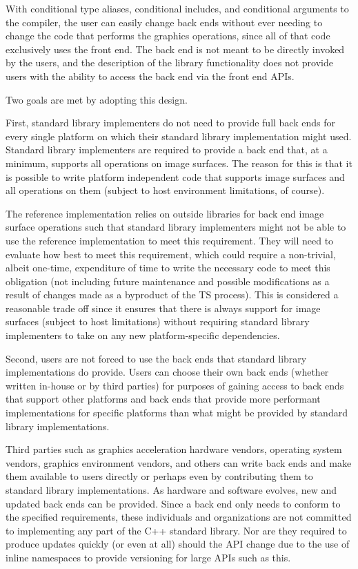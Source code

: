 \pnum
With conditional type aliases, conditional includes, and conditional arguments to the compiler, the user can easily change back ends without ever needing to change the code that performs the graphics operations, since all of that code exclusively uses the front end. The back end is not meant to be directly invoked by the users, and the description of the library functionality does not provide users with the ability to access the back end via the front end APIs.

\pnum
Two goals are met by adopting this design.

\pnum
First, standard library implementers do not need to provide full back ends for every single platform on which their standard library implementation might used. Standard library implementers are required to provide a back end that, at a minimum, supports all operations on image surfaces. The reason for this is that it is possible to write platform independent code that supports image surfaces and all operations on them (subject to host environment limitations, of course).

\pnum
The reference implementation relies on outside libraries for back end image surface operations such that standard library implementers might not be able to use the reference implementation to meet this requirement. They will need to evaluate how best to meet this requirement, which could require a non-trivial, albeit one-time, expenditure of time to write the necessary code to meet this obligation (not including future maintenance and possible modifications as a result of changes made as a byproduct of the TS process). This is considered a reasonable trade off since it ensures that there is always support for image surfaces (subject to host limitations) without requiring standard library implementers to take on any new platform-specific dependencies.

\pnum
Second, users are not forced to use the back ends that standard library implementations do provide. Users can choose their own back ends (whether written in-house or by third parties) for purposes of gaining access to back ends that support other platforms and back ends that provide more performant implementations for specific platforms than what might be provided by standard library implementations.

\pnum
Third parties such as graphics acceleration hardware vendors, operating system vendors, graphics environment vendors, and others can write back ends and make them available to users directly or perhaps even by contributing them to standard library implementations. As hardware and software evolves, new and updated back ends can be provided. Since a back end only needs to conform to the specified requirements, these individuals and organizations are not committed to implementing any part of the C++ standard library. Nor are they required to produce updates quickly (or even at all) should the API change due to the use of inline namespaces to provide versioning for large APIs such as this.


